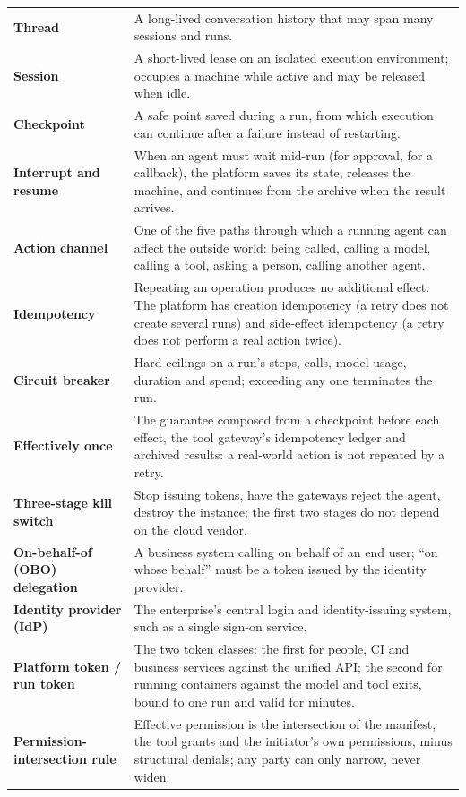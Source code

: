 \begin{longtable}{@{}>{\bfseries}L{3.9cm}L{\dimexpr\textwidth-3.9cm-2\tabcolsep\relax}@{}}
  Thread & A long-lived conversation history that may span many sessions and runs.\\
  Session & A short-lived lease on an isolated execution environment; occupies a machine while active and may be released when idle.\\
  Checkpoint & A safe point saved during a run, from which execution can continue after a failure instead of restarting.\\
  Interrupt and resume & When an agent must wait mid-run (for approval, for a callback), the platform saves its state, releases the machine, and continues from the archive when the result arrives.\\
  Action channel & One of the five paths through which a running agent can affect the outside world: being called, calling a model, calling a tool, asking a person, calling another agent.\\
  Idempotency & Repeating an operation produces no additional effect. The platform has creation idempotency (a retry does not create several runs) and side-effect idempotency (a retry does not perform a real action twice).\\
  Circuit breaker & Hard ceilings on a run's steps, calls, model usage, duration and spend; exceeding any one terminates the run.\\
  Effectively once & The guarantee composed from a checkpoint before each effect, the tool gateway's idempotency ledger and archived results: a real-world action is not repeated by a retry.\\
  Three-stage kill switch & Stop issuing tokens, have the gateways reject the agent, destroy the instance; the first two stages do not depend on the cloud vendor.\\
  On-behalf-of (OBO) delegation & A business system calling on behalf of an end user; ``on whose behalf'' must be a token issued by the identity provider.\\
  Identity provider (IdP) & The enterprise's central login and identity-issuing system, such as a single sign-on service.\\
  Platform token / run token & The two token classes: the first for people, CI and business services against the unified API; the second for running containers against the model and tool exits, bound to one run and valid for minutes.\\
  Permission-intersection rule & Effective permission is the intersection of the manifest, the tool grants and the initiator's own permissions, minus structural denials; any party can only narrow, never widen.\\

\end{longtable}
